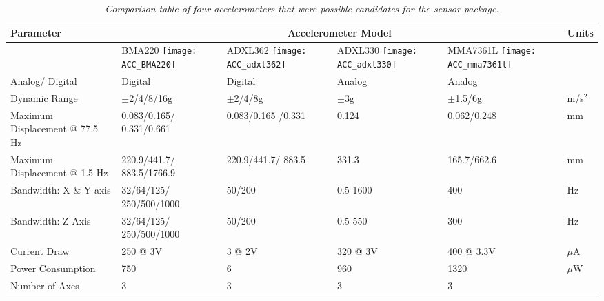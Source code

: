 \begin{table}[H]
    \begin{tabular}{|p{2.5cm}|p{2.5cm}|p{2.5cm}|p{2.5cm}|p{2.5cm}|p{2.5cm}|}
    \hline
    \textbf{Parameter} & \multicolumn{4}{c|}{\textbf{Accelerometer Model}}& \textbf{Units} \\
    \hline
            & BMA220 \texttt{[image: ACC\_BMA220]}    & ADXL362  \texttt{[image: ACC\_adxl362]}  & ADXL330  \texttt{[image: ACC\_adxl330]} & MMA7361L \texttt{[image: ACC\_mma7361l]} &  \\ \hline
    Analog/ {Digital}            & Digital                   & Digital            & Analog      & Analog        & ~ \\ \hline
    Dynamic Range              & $\pm$2/4/8/16g            & $\pm$2/4/8g         & $\pm$3g     & $\pm$1.5/6g   & m/s$^2$ \\ \hline
    Maximum Displacement @ 77.5 Hz & 0.083/0.165/ 0.331/0.661   & 0.083/0.165 /0.331   & 0.124       & 0.062/0.248   & mm    \\ \hline
    Maximum Displacement @ 1.5 Hz  & 220.9/441.7/ 883.5/1766.9  & 220.9/441.7/ 883.5   & 331.3       & 165.7/662.6   & mm    \\ \hline
    Bandwidth: X \& Y-axis               & 32/64/125/ 250/500/1000    & 50/200              & 0.5-1600    & 400           & Hz    \\ \hline
    Bandwidth: Z-Axis                     & 32/64/125/ 250/500/1000   & 50/200              & 0.5-550     & 300           & Hz    \\ \hline
    Current Draw               & 250 @ 3V           	   & 3 @ 2V   		     & 320 @ 3V    & 400 @ 3.3V    & $\mu$A     \\ \hline
    Power Consumption          & 750                       & 6                   & 960         & 1320          & $\mu$W    \\ \hline
    Number of Axes             & 3                         & 3                   & 3           & 3             & ~     \\ \hline
    \end{tabular}
    \caption{\textit{Comparison table of four accelerometers that were possible candidates for the sensor package.}}
\label{Acc_Comp_Table}
\end{table}
